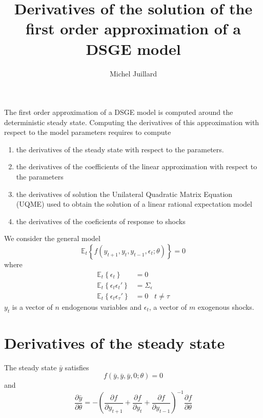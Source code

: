 \documentclass{article}
\title{Derivatives of the solution of the first order approximation of
a DSGE model}
\author{Michel Juillard}
\begin{document}
\maketitle

The first order approximation of a DSGE model is computed around the
deterministic steady state. Computing the derivatives of this
approximation with respect to the model parameters requires to compute
\begin{enumerate}
  \item the derivatives of the steady state with respect to
    the parameters.
  \item the derivatives of the coefficients of the linear
    approximation with respect to the parameters
  \item the derivatives of solution the Unilateral Quadratic
    Matrix Equation (UQME) used to obtain the solution of a linear
    rational expectation model
  \item the derivatives of the coeficients of response to shocks
\end{enumerate}

We consider the general model
\[
\mathbb{E}_t \left\{ f(y_{t+1}, y_t, y_{t-1}, \epsilon_t;
\theta)\right\} = 0
\]
where
\begin{align*}
  \mathbb{E}_t\left\{\epsilon_t\right\} &= 0\\
  \mathbb{E}_t\left\{\epsilon_t\epsilon_t'\right\} &= \Sigma_\epsilon\\
  \mathbb{E}_t\left\{\epsilon_t\epsilon_\tau'\right\} &= 0\;\;\;
  t\ne\tau
\end{align*}
$y_t$ is a vector of $n$ endogenous variables and $\epsilon_t$, a
vector of $m$ exogenous shocks.

\section{Derivatives of the steady state}

The steady state $\bar y$ satisfies
\[
f(\bar y, \bar y, \bar y, 0;\theta) = 0
\]
and
\[
\frac{\partial \bar y}{\partial \theta} = -\left(\frac{\partial
  f}{\partial y_{t+1}} +\frac{\partial f}{\partial y_t} + \frac{\partial
      f}{\partial y_{t-1}}\right)^{-1}\frac{\partial f}{\partial \theta}
\]
\end{document}
